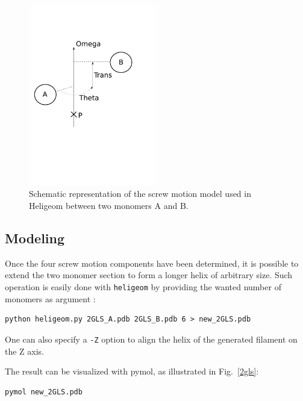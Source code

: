 \documentclass[12pt,a4paper]{article}
\begin{document}
\begin{figure}[htbp]
\center
\includegraphics*[width=0.50\textwidth]{img/schema_heligeom.pdf}
\caption{Schematic representation of the screw motion model used in Heligeom between two monomers A and B.}
\label{screw}
\end{figure}
\newpage
\subsection{Modeling}
Once the four screw motion components have been determined, it is possible to extend the two monomer section to form a longer helix of arbitrary size. 
Such operation is easily done with {\tt heligeom} by providing the wanted number of monomers as argument :
      
\begin{verbatim}
python heligeom.py 2GLS_A.pdb 2GLS_B.pdb 6 > new_2GLS.pdb
\end{verbatim}
One can also specify a \texttt{-Z} option to align the helix of the generated filament on the Z axis.

The result can be visualized with pymol, as illustrated in Fig.~\ref{2gls}:
\begin{verbatim}
pymol new_2GLS.pdb
\end{verbatim}
\end{document}
